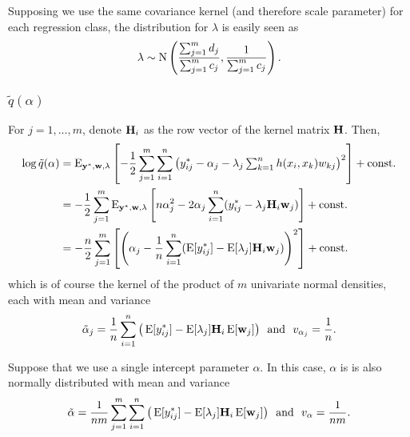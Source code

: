 Supposing we use the same covariance kernel (and therefore scale parameter) for each regression class, the distribution for $\lambda$ is easily seen as
\[
  \lambda \sim \N \left( \frac{\sum_{j=1}^m d_j}{\sum_{j=1}^m c_j}, \frac{1}{\sum_{j=1}^m c_j} \right).
\]

\subsubsection{$\tilde q(\alpha)$}

For $j = 1,\dots,m$, denote $\bH_i$ as the row vector of the kernel matrix $\bH$. Then,
\begin{align*}
  \log \tilde q(\alpha) 
  &= \E_{\by^*, \bw, \lambda} \left[ 
  - \half \sum_{j=1}^m \sum_{i=1}^n \left( y_{ij}^* - \alpha_j 
  - \lambda_j \textstyle\sum_{k=1}^n h(x_i, x_k)w_{kj} \right)^2  
  \right] + \const \\  
  &= - \half \sum_{j=1}^m \E_{\by^*, \bw, \lambda} \left[ 
  n \alpha_j^2 - 2\alpha_j \sum_{i=1}^n(y_{ij}^* - \lambda_j \bH_i \bw_j) 
  \right] + \const \\  
  &= - \half[n] \sum_{j=1}^m \left[ \left( \alpha_j - \frac{1}{n} \sum_{i=1}^n(\E[y_{ij}^*] - \E[\lambda_j] \bH_i \bw_j) \right)^2 \right] + \const \\  
\end{align*}
which is of course the kernel of the product of $m$ univariate normal densities, each with mean and variance 
\[
   \tilde \alpha_j = \frac{1}{n} \sum_{i=1}^n \big(\E [y_{ij}^*] - \E[\lambda_j]\bH_i \E[\bw_j]  \big)
   \ \text{ and } \ 
   v_{\alpha_j} = \frac{1}{n}.
\]

Suppose that we use a single intercept parameter $\alpha$. In this case, $\alpha$ is is also normally distributed with mean and variance
\[
   \tilde \alpha = \frac{1}{nm} \sum_{j=1}^m \sum_{i=1}^n \big(\E [y_{ij}^*] - \E[\lambda_j]\bH_i \E[\bw_j]  \big)
   \ \text{ and } \ 
   v_{\alpha} = \frac{1}{nm}.
\]

